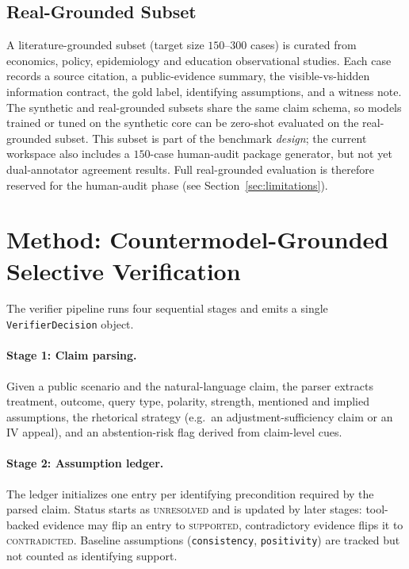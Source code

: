 \documentclass{article}
\theoremstyle{plain}
\theoremstyle{definition}
\theoremstyle{remark}
\begin{document}
\subsection{Real-Grounded Subset}

A literature-grounded subset (target size $150$--$300$ cases) is curated from
economics, policy, epidemiology and education observational studies. Each case
records a source citation, a public-evidence summary, the
visible-vs-hidden information contract, the gold label, identifying
assumptions, and a witness note. The synthetic and real-grounded subsets share
the same claim schema, so models trained or tuned on the synthetic core can be
zero-shot evaluated on the real-grounded subset. This subset is part of the
benchmark \emph{design}; the current workspace also includes a $150$-case
human-audit package generator, but not yet dual-annotator agreement results.
Full real-grounded evaluation is therefore reserved for the human-audit phase
(see Section~\ref{sec:limitations}).

\section{Method: Countermodel-Grounded Selective Verification}
\label{sec:method}

The verifier pipeline runs four sequential stages and emits a single
\texttt{VerifierDecision} object.

\paragraph{Stage 1: Claim parsing.}
Given a public scenario and the natural-language claim, the parser extracts
treatment, outcome, query type, polarity, strength, mentioned and implied
assumptions, the rhetorical strategy (e.g.\ an adjustment-sufficiency claim
or an IV appeal), and an abstention-risk flag derived from claim-level cues.

\paragraph{Stage 2: Assumption ledger.}
The ledger initializes one entry per identifying precondition required by the
parsed claim. Status starts as \textsc{unresolved} and is updated by
later stages: tool-backed evidence may flip an entry to \textsc{supported},
contradictory evidence flips it to \textsc{contradicted}. Baseline
assumptions (\texttt{consistency}, \texttt{positivity}) are tracked but not
counted as identifying support.
\end{document}
